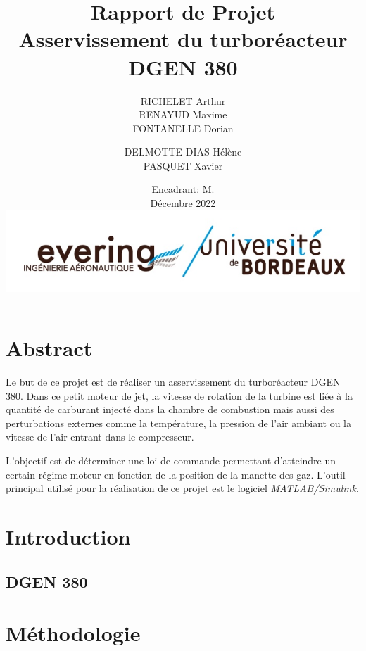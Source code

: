 \documentclass[12pt]{report}
\title{{\Huge Rapport de Projet} \\Asservissement du turboréacteur DGEN 380 }
\author{RICHELET Arthur
\\RENAYUD Maxime
\\FONTANELLE Dorian
\and
  DELMOTTE-DIAS Hélène
\\PASQUET Xavier}
\date{Encadrant: M. \\ \vspace{0.5cm}
Décembre 2022 \\
\vspace{2cm}
\includegraphics[scale=0.4]{fig/evering_logo.jpg}}
\begin{document}
\maketitle

\tableofcontents


\newpage

\chapter{Abstract}

Le but de ce projet est de réaliser un asservissement
du turboréacteur DGEN 380.
Dans ce petit moteur de jet, la vitesse de rotation de la turbine 
est liée à la quantité de carburant injecté dans la chambre de 
combustion mais aussi des perturbations externes comme la température,
la pression de l'air ambiant ou la vitesse de l'air entrant dans le compresseur.\newline
 
L'objectif est de déterminer une loi de commande permettant d'atteindre un certain
régime moteur en fonction de la position de la manette des gaz. L'outil principal
utilisé pour la réalisation de ce projet est le logiciel {\it MATLAB/Simulink}.


\chapter{Introduction}
\section{DGEN 380} %
\lipsum[1-2]

\section{}

\chapter{Méthodologie}
\end{document}
